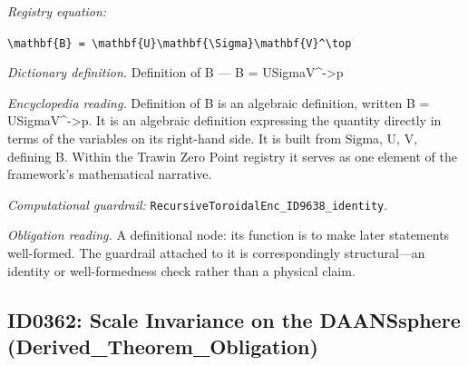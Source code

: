 \documentclass[11pt]{article}
\theoremstyle{remark}
\begin{document}
\noindent\textit{Registry equation:}\par
{\small\texttt{\textbackslash{}mathbf\{B\} = \textbackslash{}mathbf\{U\}\textbackslash{}mathbf\{\textbackslash{}Sigma\}\textbackslash{}mathbf\{V\}\textasciicircum{}\textbackslash{}top}}\par\medskip
\noindent\textit{Dictionary definition.} Definition of B --- B = USigmaV\textasciicircum{}->p\par\medskip
\noindent\textit{Encyclopedia reading.} Definition of B is an algebraic definition, written B = USigmaV\textasciicircum{}->p. It is an algebraic definition expressing the quantity directly in terms of the variables on its right-hand side. It is built from Sigma, U, V, defining B. Within the Trawin Zero Point registry it serves as one element of the framework's mathematical narrative.
\par\medskip\noindent\textit{Computational guardrail:} \texttt{RecursiveToroidalEnc\_ID9638\_identity}.
\par\medskip\noindent\textit{Obligation reading.} A definitional node: its function is to make later statements well-formed. The guardrail attached to it is correspondingly structural---an identity or well-formedness check rather than a physical claim.

\subsection{ID0362: Scale Invariance on the DAANSsphere (Derived\_Theorem\_Obligation)}
\end{document}
